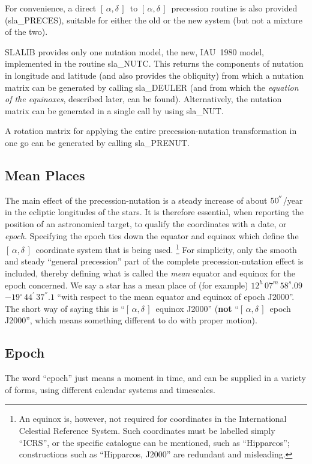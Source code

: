 \documentclass[11pt,twoside]{article}
\newcommand{\radec}     {$[\,\alpha,\delta\,]$}
\newcommand{\arcsec}[2] {\arcseci{#1}$\hspace{-0.4em}.#2$}
\newcommand{\arcsec}[2] {
      {$#1\hspace{-0.05em}^{'\hspace{-0.1em}'}\hspace{-0.4em}.#2$}
   }
\newcommand{\arcseci}[1] {$#1\hspace{-0.05em}$\raisebox{-0.5ex}
                         {$^{'\hspace{-0.1em}'}$}}
\renewcommand{\arcseci}[1] {$#1\hspace{-0.05em}^{'\hspace{-0.1em}'}$}
\newcommand{\dms}[4]    {$#1^{\circ}\,#2\raisebox{-0.5ex}
                        {$^{'}$}\,$\arcsec{#3}{#4}}
\renewcommand{\dms}[4]{$#1^{\circ}\,#2^{'}\,#3^{''}.#4$}
\newcommand{\tseci}[1]   {$#1$\mbox{$^{\rm s}$}}
\newcommand{\tsec}[2]    {\tseci{#1}$\hspace{-0.3em}.#2$}
\renewcommand{\tsec}[2] {$#1^{\rm s}\hspace{-0.3em}.#2$}
\newcommand{\hms}[4]    {$#1^{\rm h}\,#2^{\rm m}\,$\tsec{#3}{#4}}
\renewcommand{\hms}[4] {$#1^{h}\,#2^{m}\,#3^{s}.#4$}
\begin{document}
For convenience, a direct \radec\ to \radec\ precession routine is
also provided
(sla\_PRECES),
suitable for either the old or the new system (but not a
mixture of the two).

SLALIB provides only one nutation model, the new, IAU~1980 model,
implemented in the routine
sla\_NUTC.
This returns the components of nutation
in longitude and latitude (and also provides the obliquity) from
which a nutation matrix can be generated by calling
sla\_DEULER
(and from which the {\it equation of the equinoxes}, described
later, can be found).  Alternatively,
the nutation matrix can be generated in a single call by using
sla\_NUT.

A rotation matrix for applying the entire precession-nutation
transformation in one go can be generated by calling
sla\_PRENUT.

\subsection{Mean Places}
The main effect of the precession-nutation is a steady increase of about
\arcseci{50}/year in the ecliptic longitudes of the stars.  It is therefore
essential, when reporting the position of an astronomical target, to
qualify the coordinates with a date, or {\it epoch}.
Specifying the epoch ties down the equator and
equinox which define the \radec\ coordinate system that is
being used.
\footnote{An equinox is, however, not required for coordinates
in the International Celestial Reference System.  Such coordinates must
be labelled simply ``ICRS'', or the specific catalogue can be mentioned,
such as ``Hipparcos'';  constructions such as ``Hipparcos, J2000'' are
redundant and misleading.}  For simplicity, only
the smooth and steady ``general
precession'' part of the complete precession-nutation effect is
included, thereby defining what is called the {\it mean}\/
equator and equinox for the epoch concerned.  We say a star
has a mean place of (for example)
\hms{12}{07}{58}{09}~\dms{-19}{44}{37}{1} ``with respect to the mean equator
and equinox of epoch J2000''.  The short way of saying
this is ``\radec\ equinox J2000'' ({\bf not} ``\radec\ epoch J2000'',
which means something different to do with
proper motion).

\subsection{Epoch}
The word ``epoch'' just means a moment in time, and can be supplied
in a variety of forms, using different calendar systems and timescales.
\end{document}
